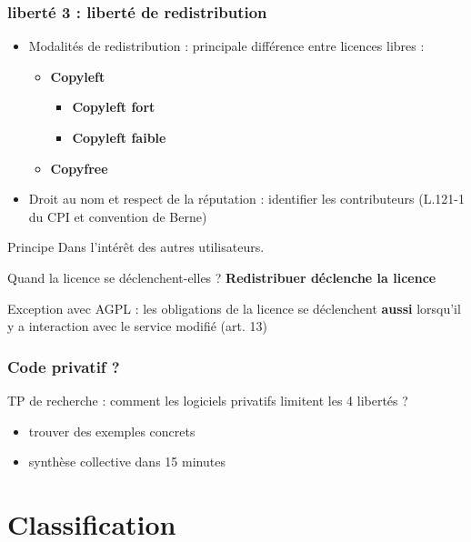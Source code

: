 \documentclass{beamer}
\begin{document}
\begin{frame} \frametitle{liberté 3 : liberté de redistribution}
  \begin{itemize}
  \item Modalités de redistribution : principale différence entre
    licences libres :
    \begin{itemize}
    \item \textbf{Copyleft}
      \begin{itemize}
      \item \textbf{Copyleft fort}
      \item \textbf{Copyleft faible}
      \end{itemize}
    \item \textbf{Copyfree}
    \end{itemize}

  \item Droit au nom et respect de la réputation : identifier les
    contributeurs (L.121-1 du CPI et convention de Berne)
  \end{itemize}
  \begin{alertblock}{Principe}
    Dans l'intérêt des autres utilisateurs.
  \end{alertblock}

\begin{alertblock}{Quand la licence se déclenchent-elles ?}
  \textbf{Redistribuer déclenche la licence}
\end{alertblock}
 
Exception avec AGPL : les obligations de la licence se déclenchent
\textbf{aussi} lorsqu'il y a interaction avec le service modifié
(art. 13)
\end{frame}

\begin{frame}
  \frametitle{Code privatif ?}
  TP de recherche : comment les logiciels privatifs limitent les 4 libertés ?

  \begin{itemize}
  \item trouver des exemples concrets
  \item synthèse collective dans 15 minutes
  \end{itemize}
\end{frame}




\section{Classification}
\end{document}
